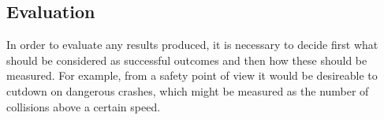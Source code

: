 \subsection{Evaluation}
In order to evaluate any results produced, it is necessary to decide
first what should be considered as successful outcomes and then how
these should be measured. For example, from a safety point of view it
would be desireable to cutdown on dangerous crashes, which might be
measured as the number of collisions above a certain speed.
